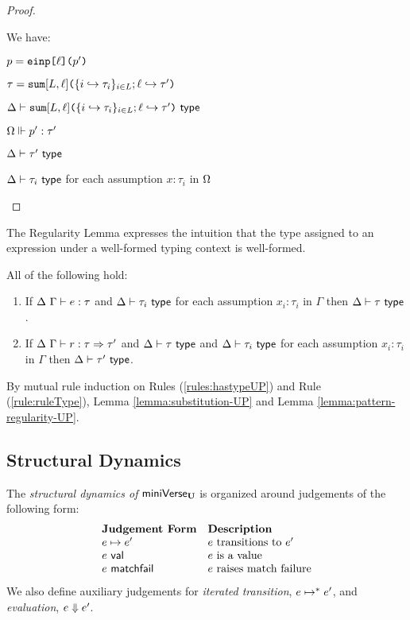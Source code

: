 {{{{\begin{proof}
\begin{byCases}
\begin{pfsteps*}
\end{pfsteps*}
\resetpfcounter
\item[\text{(\ref{rule:patType-inj})}] We have:
\begin{pfsteps*}
  \item $p=\texttt{einp}\texttt{[}\ell\texttt{](}p'\texttt{)}$ 
  \item $\tau=\texttt{sum}[L, \ell]\texttt{(}\{i \hookrightarrow \tau_{i}\}_{i \in L}; \ell \hookrightarrow \tau'\texttt{)}$ 
  \item $\Delta \vdash \texttt{sum}[L, \ell]\texttt{(}\{i \hookrightarrow \tau_{i}\}_{i \in L}; \ell \hookrightarrow \tau'\texttt{)}~\mathsf{type}$  
  \item $\Omega \Vdash p' : \tau'$  
  \item $\Delta \vdash \tau'~\mathsf{type}$   
  \item $\Delta \vdash \tau_i~\mathsf{type}$ for each assumption $x : \tau_i$ in $\Omega$ 
\end{pfsteps*}
\end{byCases}
\end{proof}

The Regularity Lemma expresses the intuition that the type assigned to an expression under a well-formed typing context is well-formed. 
\begin{lemma}[Regularity]\label{lemma:regularity-UP} All of the following hold:
\begin{enumerate}
\item If $\Delta~\Gamma \vdash e : \tau$ and $\Delta \vdash \tau_i~\mathsf{type}$ for each assumption $x_i : \tau_i$ in $\Gamma$ then $\Delta \vdash \tau~\mathsf{type}$.
\item If $\Delta~\Gamma \vdash r : \tau \Rightarrow \tau'$ and $\Delta \vdash \tau~\mathsf{type}$ and $\Delta \vdash \tau_i~\mathsf{type}$ for each assumption $x_i : \tau_i$ in $\Gamma$ then $\Delta \vdash \tau'~\mathsf{type}$.
\end{enumerate}
\end{lemma}
\begin{proof-sketch} By mutual rule induction on Rules (\ref{rules:hastypeUP}) and Rule (\ref{rule:ruleType}), Lemma \ref{lemma:substitution-UP} and Lemma \ref{lemma:pattern-regularity-UP}.
\end{proof-sketch}
\subsection{Structural Dynamics}\label{sec:dynamics-UP}
The \emph{structural dynamics of }$\mathsf{miniVerse}_\textbf{U}$ is organized around judgements of the following form:
\[\begin{array}{ll}
\textbf{Judgement Form} & \textbf{Description}\\
e \mapsto e' & \text{$e$ transitions to $e'$}\\
e~\mathsf{val} & \text{$e$ is a value}\\
e~\mathsf{matchfail} & \text{$e$ raises match failure}
\end{array}\]
We also define auxiliary judgements for \emph{iterated transition}, $e \mapsto^{*} e'$, and \emph{evaluation}, $e \Downarrow e'$.

}}}}
